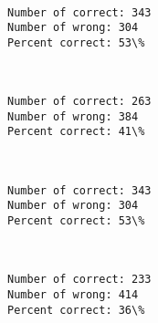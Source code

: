 \documentclass[11pt]{article}
\begin{document}
    \begin{center}
    \end{center}
    { \hspace*{\fill} \\}
    
    \begin{Verbatim}[commandchars=\\\{\}]
Number of correct: 343
Number of wrong: 304
Percent correct: 53\%

    \end{Verbatim}

    \begin{center}
    \end{center}
    { \hspace*{\fill} \\}
    
    \begin{Verbatim}[commandchars=\\\{\}]
Number of correct: 263
Number of wrong: 384
Percent correct: 41\%

    \end{Verbatim}

    \begin{center}
    \end{center}
    { \hspace*{\fill} \\}
    
    \begin{Verbatim}[commandchars=\\\{\}]
Number of correct: 343
Number of wrong: 304
Percent correct: 53\%

    \end{Verbatim}

    \begin{center}
    \end{center}
    { \hspace*{\fill} \\}
    
    \begin{Verbatim}[commandchars=\\\{\}]
Number of correct: 233
Number of wrong: 414
Percent correct: 36\%

    \end{Verbatim}
\end{document}
